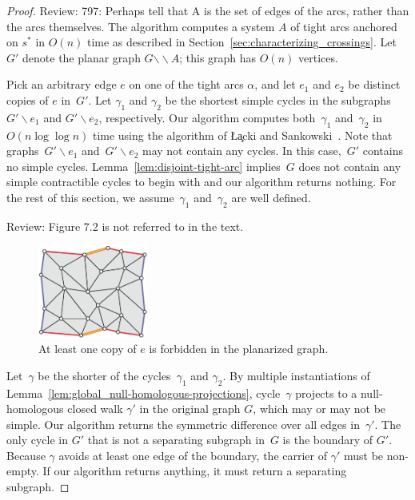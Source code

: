 \documentclass[letterpaper,review]{siamart190516}
\def\snip{\mathbin{\raisebox{0.15ex}{\rotatebox[origin=c]{60}{\Rightscissors}\!}}}
\def\snip{\mathbin{\backslash\!\!\backslash}}
\def\subsnip{\mathbin{\raisebox{0.15ex}{\rotatebox[origin=c]{60}{\footnotesize\Rightscissors}\!}}}
\def\Gsnip{\mathord{G_{\subsnip}}}
\def\Gsnip{G'}
\def\rnote#1{\color{red}Review: #1 \color{black}}
\begin{document}
{\begin{proof}

\rnote{797: Perhaps tell that A is the set of edges of the arcs, rather than the arcs themselves. }
The algorithm computes a system $A$ of tight arcs anchored on $s^*$ in $O(n)$ time as described in
Section~\ref{sec:characterizing_crossings}.
Let $\Gsnip$ denote the planar graph $G \snip A$; this graph has $O(n)$ vertices.

Pick an arbitrary edge $e$ on one of the tight arcs $\alpha$, and let $e_1$ and $e_2$ be distinct
copies of $e$
in~$\Gsnip$.  Let $\gamma_1$ and $\gamma_2$ be the shortest simple cycles in the  subgraphs $\Gsnip
\backslash e_1$ and $\Gsnip \backslash e_2$, respectively.  Our algorithm computes both~$\gamma_1$
and~$\gamma_2$ in $O(n \log\log n)$ time using the algorithm of \L\c{a}cki and
Sankowski~\cite{ls-mcsc-11}. Note that graphs~$\Gsnip \backslash e_1$ and~$\Gsnip \backslash e_2$
may not contain any cycles. In this case,~$\Gsnip$ contains no simple cycles.
Lemma~\ref{lem:disjoint-tight-arc} implies~$G$ does not contain any simple contractible cycles to begin with and our algorithm returns nothing. 
For the rest of this section, we assume~$\gamma_1$ and~$\gamma_2$ are well defined.

\rnote{Figure 7.2 is not referred to in the text. }
\begin{figure}[ht]
\centering
\includegraphics[height=1.2in]{Fig/forbidden-pair}
\caption{At least one copy of $e$ is forbidden in the planarized graph.}
\label{fig:global_forbidden-pair}
\end{figure}

Let~$\gamma$ be the shorter of the cycles~$\gamma_1$ and $\gamma_2$.  By multiple instantiations of Lemma~\ref{lem:global_null-homologous-projections}, cycle~$\gamma$ projects to a null-homologous closed walk $\gamma'$ in the original graph $G$, which may or may not be simple.
Our algorithm returns the symmetric difference over all edges in~$\gamma'$.
The only cycle in $\Gsnip$ that is not a separating subgraph in~$G$ is the boundary of $\Gsnip$.
Because $\gamma$ avoids at least one edge of the boundary, the carrier of $\gamma'$ must be non-empty. If our algorithm returns anything, it must return a separating subgraph.


\end{proof}}
\end{document}
